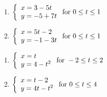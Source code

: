 \documentclass{ximera}
\begin{document}
\begin{multicols}{2}

\begin{enumerate}

\setcounter{enumi}{\value{HW}}

\item  ${\displaystyle \left\{ \begin{array}{l} x = 3-5t \\ y =-5+7t \end{array} \right. \vspace{.25in} \mbox{for } 0 \leq t \leq 1}$

\item  ${\displaystyle \left\{ \begin{array}{l} x = 5t-2 \\ y =-1-3t \end{array} \right. \vspace{.25in} \mbox{for } 0 \leq t \leq 1}$

\setcounter{HW}{\value{enumi}}

\end{enumerate}

\end{multicols}

\begin{multicols}{2}

\begin{enumerate}

\setcounter{enumi}{\value{HW}}

\item  ${\displaystyle \left\{ \begin{array}{l} x = t \\ y = 4-t^2  \end{array} \right. \vspace{.25in} \mbox{for } -2 \leq t \leq 2}$

\item  ${\displaystyle \left\{ \begin{array}{l} x = t-2 \\ y = 4t-t^2  \end{array} \right. \vspace{.25in} \mbox{for } 0 \leq t \leq 4}$


\setcounter{HW}{\value{enumi}}

\end{enumerate}

\end{multicols}
\end{document}
